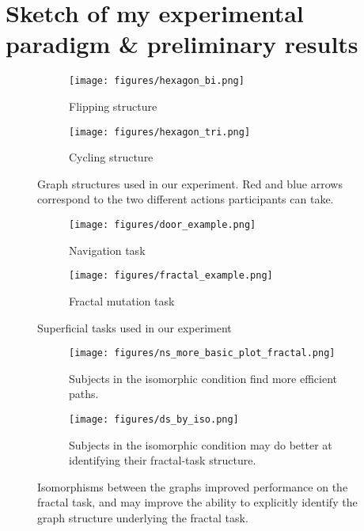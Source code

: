 \documentclass[11pt]{article}
\begin{document}
\section{Sketch of my experimental paradigm \& preliminary results}
\begin{figure}[p]
\centering
\begin{subfigure}{0.33\textwidth}
\texttt{[image: figures/hexagon\_bi.png]}
\caption{Flipping structure}
\end{subfigure}
\hspace{3em}
\begin{subfigure}{0.33\textwidth}
\texttt{[image: figures/hexagon\_tri.png]}
\caption{Cycling structure}
\end{subfigure}
\caption{Graph structures used in our experiment. Red and blue arrows correspond to the two different actions participants can take.}
\label{hexagon_diagrams}
\end{figure}
\begin{figure}[p]
\centering
\begin{subfigure}{0.33\textwidth}
\texttt{[image: figures/door\_example.png]}
\caption{Navigation task}
\end{subfigure}
\hspace{3em}
\begin{subfigure}{0.33\textwidth}
\texttt{[image: figures/fractal\_example.png]}
\caption{Fractal mutation task}
\end{subfigure}
\caption{Superficial tasks used in our experiment}
\label{tasks}
\end{figure}
\begin{figure}[p]
\centering
\begin{subfigure}{0.45\textwidth}
\texttt{[image: figures/ns\_more\_basic\_plot\_fractal.png]}
\caption{Subjects in the isomorphic condition find more efficient paths.}
\label{results_ns}
\end{subfigure}
\hspace{3em}
\begin{subfigure}{0.45\textwidth}
\texttt{[image: figures/ds\_by\_iso.png]}
\caption{Subjects in the isomorphic condition may do better at identifying their fractal-task structure.}
\label{results_ds}
\end{subfigure}
\caption{Isomorphisms between the graphs improved performance on the fractal task, and may improve the ability to explicitly identify the graph structure underlying the fractal task.}
\label{results}
\end{figure}
\end{document}
